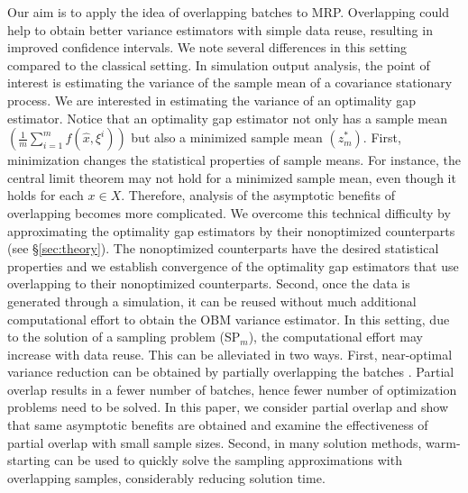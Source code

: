 \documentclass[12pt]{article}
\newcommand{\X}{X}
\newcommand{\x}{x}
\newcommand{\xh}{{\hat{\x}}}
\newcommand{\xit}{\xi}
\newcommand{\xiti}{\xit^i}
\newcommand{\zs}{z^*}
\begin{document}
Our aim is to apply the idea of overlapping batches to MRP.  
Overlapping could help to obtain better variance estimators with simple data reuse, resulting in improved confidence intervals.
We note several differences in this setting compared to the classical setting.  
In simulation output analysis, the point of interest is estimating the variance of the sample mean of a covariance stationary process.  
We are interested in estimating the variance of an optimality gap estimator.  
Notice that an optimality gap estimator not only has a sample mean $(\frac{1}{m} \sum_{i=1}^m f(\xh,\xiti))$ but also a minimized sample mean $(\zs_m)$.  
First, minimization changes the statistical properties of sample means.  
For instance, the central limit theorem may not hold for a minimized sample mean, even though it holds for each $\x \in \X$.  
Therefore, analysis of the asymptotic benefits of overlapping becomes more complicated.
We overcome this technical difficulty by approximating the optimality gap estimators by their nonoptimized counterparts (see \S \ref{sec:theory}).  
The nonoptimized counterparts have the desired statistical properties and we establish convergence of the optimality gap estimators that use overlapping to their nonoptimized counterparts. 
Second, once the data is generated through a simulation, it can be reused without much additional computational effort to obtain the OBM variance estimator.  
In this setting, due to the solution of a sampling problem (SP$_m$), the computational effort may increase with data reuse.  
This can be alleviated in two ways. 
First, near-optimal variance reduction can be obtained by partially overlapping the batches \citep{Welch1987,Song1992}.  
Partial overlap results in a fewer number of batches, hence fewer number of optimization problems need to be solved.
In this paper, we consider partial overlap and show that same asymptotic benefits are obtained and examine the effectiveness of partial overlap with small sample sizes. 
Second, in many solution methods, warm-starting can be used to quickly solve the sampling approximations with overlapping samples, considerably reducing solution time.




\end{document}
